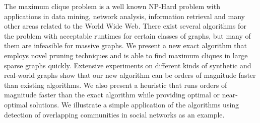 The maximum clique problem is a well known NP-Hard problem with
applications in data mining, network analysis, information retrieval and many other
areas related to the World Wide Web.
There exist several algorithms for the problem with acceptable runtimes for
certain classes of graphs, but many of them are infeasible for massive graphs. 
We present a new exact algorithm that employs novel pruning techniques and 
is able to find maximum cliques in large sparse graphs quickly. 
Extensive experiments on different kinds of synthetic and 
real-world graphs show that our new algorithm can be orders of magnitude 
faster than existing algorithms.
We also present a heuristic that runs orders of magnitude faster than 
the exact algorithm while providing optimal or near-optimal solutions.
We illustrate a simple application of the algorithms using  
detection of overlapping communities in social networks as an example. 

